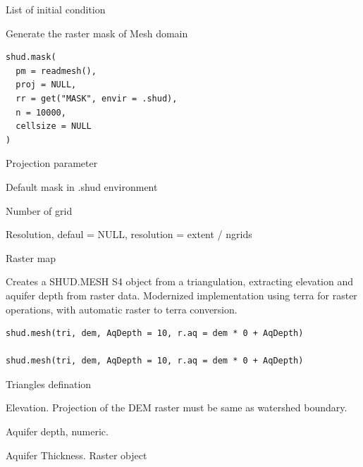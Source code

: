 \documentclass[a4paper]{book}
\begin{document}
%
\begin{Value}
List of initial condition
\end{Value}
%
\begin{Description}\relax
Generate the raster mask of Mesh domain
\end{Description}
%
\begin{Usage}
\begin{verbatim}
shud.mask(
  pm = readmesh(),
  proj = NULL,
  rr = get("MASK", envir = .shud),
  n = 10000,
  cellsize = NULL
)
\end{verbatim}
\end{Usage}
%
\begin{Arguments}
\begin{ldescription}
\item[\code{pm}] 

\item[\code{proj}] Projection parameter

\item[\code{rr}] Default mask in .shud environment

\item[\code{n}] Number of grid

\item[\code{cellsize}] Resolution, defaul = NULL, resolution = extent / ngrids
\end{ldescription}
\end{Arguments}
%
\begin{Value}
Raster map
\end{Value}
%
\begin{Description}\relax
Creates a SHUD.MESH S4 object from a triangulation, extracting elevation
and aquifer depth from raster data. Modernized implementation using terra
for raster operations, with automatic raster to terra conversion.
\end{Description}
%
\begin{Usage}
\begin{verbatim}
shud.mesh(tri, dem, AqDepth = 10, r.aq = dem * 0 + AqDepth)

shud.mesh(tri, dem, AqDepth = 10, r.aq = dem * 0 + AqDepth)
\end{verbatim}
\end{Usage}
%
\begin{Arguments}
\begin{ldescription}
\item[\code{tri}] Triangles defination

\item[\code{dem}] Elevation. Projection of the DEM raster must be same as watershed boundary.

\item[\code{AqDepth}] Aquifer depth, numeric.

\item[\code{r.aq}] Aquifer Thickness. Raster object
\end{ldescription}
\end{Arguments}
\end{document}
